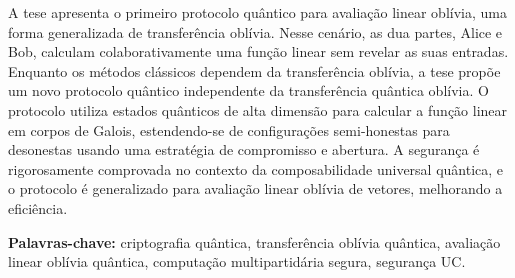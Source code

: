 \documentclass[12pt]{report}
\begin{document}
A tese apresenta o primeiro protocolo quântico para avaliação linear oblívia, uma forma generalizada de transferência oblívia. Nesse cenário, as dua partes, Alice e Bob, calculam colaborativamente uma função linear sem revelar as suas entradas. Enquanto os métodos clássicos dependem da transferência oblívia, a tese propõe um novo protocolo quântico independente da transferência quântica oblívia. O protocolo utiliza estados quânticos de alta dimensão para calcular a função linear em corpos de Galois, estendendo-se de configurações semi-honestas para desonestas usando uma estratégia de compromisso e abertura. A segurança é rigorosamente comprovada no contexto da composabilidade universal quântica, e o protocolo é generalizado para avaliação linear oblívia de vetores, melhorando a eficiência.

\vfill
\begin{flushleft}
\textbf{Palavras-chave:} criptografia qu\^{a}ntica, transferência oblívia quântica, avaliação linear oblívia quântica, computação multipartidária segura, segurança UC.
\end{flushleft}
\end{document}
